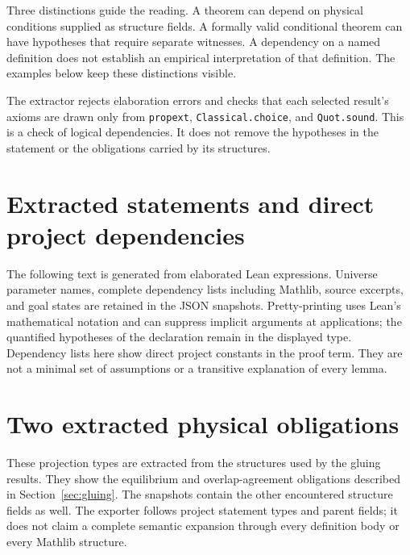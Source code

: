 \documentclass[11pt,a4paper]{article}
\begin{document}
Three distinctions guide the reading. A theorem can depend on physical
conditions supplied as structure fields. A formally valid conditional theorem
can have hypotheses that require separate witnesses. A dependency on a named
definition does not establish an empirical interpretation of that definition.
The examples below keep these distinctions visible.

The extractor rejects elaboration errors and checks that each selected result's
axioms are drawn only from \texttt{propext}, \texttt{Classical.choice}, and
\texttt{Quot.sound}. This is a check of logical dependencies. It does not remove
the hypotheses in the statement or the obligations carried by its structures.








\clearpage
\appendix
\section{Extracted statements and direct project dependencies}
\label{sec:formal}
The following text is generated from elaborated Lean expressions. Universe
parameter names, complete dependency lists including Mathlib, source excerpts,
and goal states are retained in the JSON snapshots. Pretty-printing uses Lean's
mathematical notation and can suppress implicit arguments at applications;
the quantified hypotheses of the declaration remain in the displayed type.
Dependency lists here show direct project constants in the proof term. They
are not a minimal set of assumptions or a transitive explanation of every lemma.


\section{Two extracted physical obligations}
These projection types are extracted from the structures used by the gluing
results. They show the equilibrium and overlap-agreement obligations described
in Section~\ref{sec:gluing}. The snapshots contain the other encountered
structure fields as well. The exporter follows project statement types and
parent fields; it does not claim a complete semantic expansion through every
definition body or every Mathlib structure.
\end{document}
